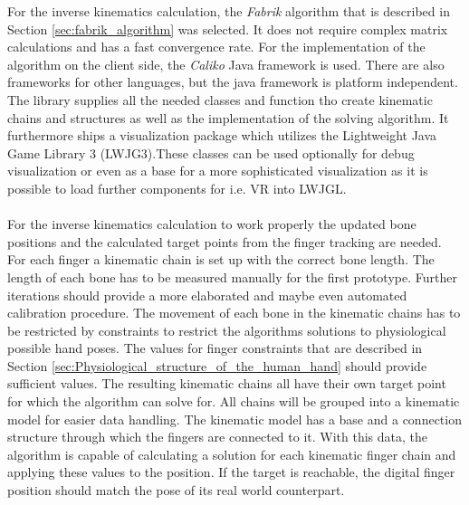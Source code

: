 For the inverse kinematics calculation, the \textit{Fabrik} algorithm that is described in Section \ref{sec:fabrik_algorithm} was selected. It does not require complex matrix calculations and has a fast convergence rate. For the implementation of the algorithm on the client side, the \textit{Caliko} Java framework\cite{Lansley.2016} is used. There are also frameworks for other languages, but the java framework is platform independent. The library supplies all the needed classes and function tho create kinematic chains and structures as well as the implementation of the solving algorithm. It furthermore ships a visualization package which utilizes the Lightweight Java Game Library 3 (LWJG3).These classes can be used optionally for debug visualization or even as a base for a more sophisticated visualization as it is possible to load further components for i.e. VR into LWJGL.\\\\
For the inverse kinematics calculation to work properly the updated bone positions and the calculated target points from the finger tracking are needed.
For each finger a kinematic chain is set up with the correct bone length. The length of each bone has to be measured manually for the first prototype. Further iterations should provide a more elaborated and maybe even automated calibration procedure. The movement of each bone in the kinematic chains has to be restricted by constraints to restrict the algorithms solutions to physiological possible hand poses. The values for finger constraints that are described in Section \ref{sec:Physiological_structure_of_the_human_hand} should provide sufficient values. The resulting kinematic chains all have their own target point for which the algorithm can solve for. All chains will be grouped into a kinematic model for easier data handling. The kinematic model has a base and a connection structure through which the fingers are connected to it.  With this data, the algorithm is capable of calculating a solution for each kinematic finger chain and applying these values to the position. If the target is reachable, the digital finger position should match the pose of its real world counterpart.